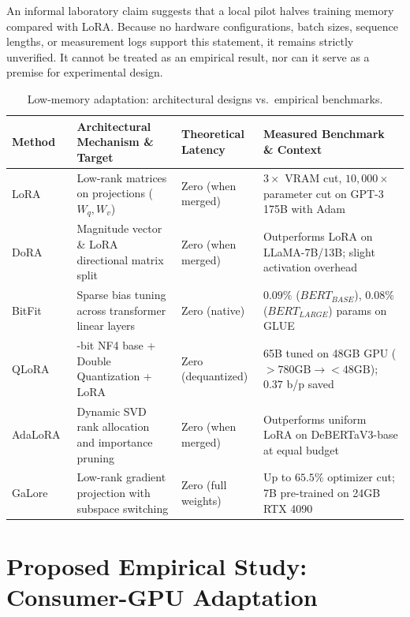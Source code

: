 \documentclass[11pt,a4paper]{article}
\begin{document}
An informal laboratory claim suggests that a local pilot halves training memory compared with LoRA. Because no hardware configurations, batch sizes, sequence lengths, or measurement logs support this statement, it remains strictly unverified. It cannot be treated as an empirical result, nor can it serve as a premise for experimental design.

\begin{table}[t]
\centering
\small
\caption{Low-memory adaptation: architectural designs vs.\ empirical benchmarks.}
\label{tab:peft_comparison}
\begin{tabularx}{\textwidth}{@{} l >{\raggedright\arraybackslash}p{3.8cm} >{\raggedright\arraybackslash}p{2.3cm} >{\raggedright\arraybackslash}X @{}}
\toprule
\textbf{Method} & \textbf{Architectural Mechanism \& Target} & \textbf{Theoretical Latency} & \textbf{Measured Benchmark \& Context} \\
\midrule
LoRA~\cite{hu2021lora} & Low-rank matrices on projections ($W_q, W_v$) & Zero (when merged) & $3\times$ VRAM cut, $10,000\times$ parameter cut on GPT-3 175B with Adam~\cite{hu2021lora} \\
\addlinespace
DoRA~\cite{liu2024dora} & Magnitude vector \& LoRA directional matrix split & Zero (when merged) & Outperforms LoRA on LLaMA-7B/13B; slight activation overhead~\cite{liu2024dora} \\
\addlinespace
BitFit~\cite{benzaken2021bitfit} & Sparse bias tuning across transformer linear layers & Zero (native) & $0.09\%$ ($BERT_{BASE}$), $0.08\%$ ($BERT_{LARGE}$) params on GLUE~\cite{benzaken2021bitfit} \\
\addlinespace
QLoRA~\cite{dettmers2023qlora} & 4-bit NF4 base + Double Quantization + LoRA & Zero (dequantized) & 65B tuned on 48GB GPU ($>780\text{GB} \to <48\text{GB}$); $0.37$ b/p saved~\cite{dettmers2023qlora} \\
\addlinespace
AdaLoRA~\cite{zhang2023adalora} & Dynamic SVD rank allocation and importance pruning & Zero (when merged) & Outperforms uniform LoRA on DeBERTaV3-base at equal budget~\cite{zhang2023adalora} \\
\addlinespace
GaLore~\cite{zhao2024galore} & Low-rank gradient projection with subspace switching & Zero (full weights) & Up to $65.5\%$ optimizer cut; 7B pre-trained on 24GB RTX 4090~\cite{zhao2024galore} \\
\bottomrule
\end{tabularx}
\end{table}

\section{Proposed Empirical Study: Consumer-GPU Adaptation}
\end{document}
